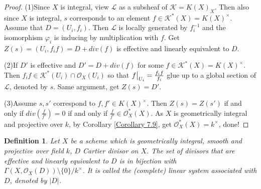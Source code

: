 \documentclass{ctexart}
\newtheorem{definition}{Definition}[section]
\begin{document}
\begin{proof}
    (1)Since $X$ is integral, view $\mathcal{L}$ as a subsheaf of $\mathcal{K} = K(X)_{X}$.
    Then also since $X$ is integral, $s$ corresponds to an element $f\in \mathcal{K}^{\ast}(X) = K(X)^{\times}$.
    Assume that $D = (U_{i}, f_{i})$.
    Then $\mathcal{L}$ is locally generated by $f_{i}^{-1}$ and the isomorphism $\varphi_{i}$ is inducing by multiplication with $f$.
    Get $Z(s) = (U_{i}, f_{i}f) = D + div(f)$ is effective and linearly equivalent to $D$.
    \par
    (2)If $D'$ is effective and $D' = D + div(f)$ for some $f\in \mathcal{K}^{\ast}(X) = K(X)^{\times}$.
    Then $f_{i}f\in \mathcal{K}^{\ast}(U_{i}) \cap \mathcal{O}_{X}(U_{i})$ so that $f\big{|}_{U_{i}} = \frac{f_{i}f}{f_{i}}$ glue up to a global section of $\mathcal{L}$, denoted by $s$.
    Same argument, get $Z(s) = D'$.
    \par
    (3)Assume $s, s'$ correspond to $f,f'\in K(X)^{\times}$.
    Then $Z(s) = Z(s')$ if and only if $div(\frac{f}{f'}) = 0$ if and only if $\frac{f}{f'}\in \mathcal{O}_{X}^{\ast}(X)$.
    As $X$ is geometrically integral and projective over $k$, by Corollary \ref{Corollary 7.9}, get $\mathcal{O}_{X}^{\ast}(X) = k^{\times}$, done!
\end{proof}
\begin{definition}
    Let $X$ be a scheme which is geometrically integral, smooth and projective over field $k$, $D$ Cartier divisor on $X$.
    The set of divisors that are effective and linearly equivalent to $D$ is in bijection with $\Gamma(X, \mathcal{O}_{X}(D)) \setminus \{0\}/k^{\times}$.
    It is called the (complete) linear system associated with $D$, denoted by $|D|$.
\end{definition}
\end{document}
